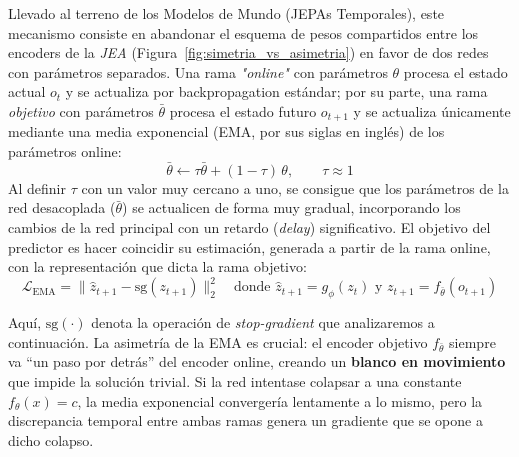 Llevado al terreno de los Modelos de Mundo (JEPAs Temporales), este mecanismo consiste en abandonar el esquema de pesos compartidos entre los encoders de la \textit{JEA} (Figura~\ref{fig:simetria_vs_asimetria}) en favor de dos redes con parámetros separados. Una rama \textit{"online"} con parámetros $\theta$ procesa el estado actual $o_t$ y se actualiza por backpropagation estándar; por su parte, una rama \textit{objetivo} con parámetros $\bar{\theta}$ procesa el estado futuro $o_{t+1}$ y se actualiza únicamente mediante una media exponencial (EMA, por sus siglas en inglés) de los parámetros online:
\begin{equation}
\label{eq:ema_update}
\bar{\theta} \leftarrow \tau \bar{\theta} + (1 - \tau)\,\theta, \qquad \tau \approx 1
\end{equation}
Al definir $\tau$ con un valor muy cercano a uno, se consigue que los parámetros de la red desacoplada ($\bar{\theta}$) se actualicen de forma muy gradual, incorporando los cambios de la red principal con un retardo (\emph{delay}) significativo. El objetivo del predictor es hacer coincidir su estimación, generada a partir de la rama online, con la representación que dicta la rama objetivo:
\begin{equation}
\label{eq:ema_loss}
\mathcal{L}_{\text{EMA}} = \| \hat{z}_{t+1} - \text{sg}(z_{t+1}) \|_2^2 \quad \text{donde } \hat{z}_{t+1} = g_\phi(z_t) \text{ y } z_{t+1} = f_{\bar{\theta}}(o_{t+1})
\end{equation}

Aquí, $\text{sg}(\cdot)$ denota la operación de \textit{stop-gradient} que analizaremos a continuación. La asimetría de la EMA es crucial: el encoder objetivo $f_{\bar{\theta}}$ siempre va ``un paso por detrás'' del encoder online, creando un \textbf{blanco en movimiento} que impide la solución trivial. Si la red intentase colapsar a una constante $f_\theta(x) = c$, la media exponencial convergería lentamente a lo mismo, pero la discrepancia temporal entre ambas ramas genera un gradiente que se opone a dicho colapso.


